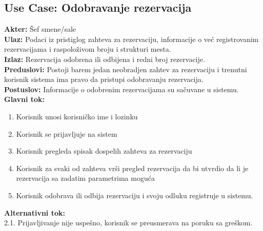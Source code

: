\documentclass{article}
\begin{document}
\subsection{\textbf{Use Case}:  Odobravanje rezervacija}
\textbf{Akter:} Šef smene/sale\\
\textbf{Ulaz:} Podaci iz pristiglog zahteva za rezervaciju, informacije o već registrovanim rezervacijama i raspoloživom broju i strukturi mesta.\\
\textbf{Izlaz:} Rezervacija odobrena ili odbijena i redni broj rezervacije.\\
\textbf{Preduslovi:} Postoji barem jedan neobradjen zahtev za rezervaciju i trenutni korisnik sistema ima pravo da pristupi odobravanju rezervacija.\\
\textbf{Postuslov:} Informacije o odobrenim rezervacijama su sačuvane u sistemu.\\
\textbf{Glavni tok:}
\begin{enumerate}
\item Korisnik unosi korisničko ime i lozinku
\item Korisnik se prijavljuje na sistem
\item Korisnik pregleda spisak dospelih zahteva za rezervaciju
\item Korisnik za svaki od zahteva vrši pregled rezervacija da bi utvrdio da li je rezervacija sa zadatim parametrima moguća
\item Korisnik odobrava ili odbija rezervaciju i svoju odluku registruje u sistemu.\\
\end{enumerate}
\textbf{Alternativni tok:}\\
       2.1. Prijavljivanje nije uspešno, korisnik se preusmerava na poruku sa greškom.\\
\end{document}
